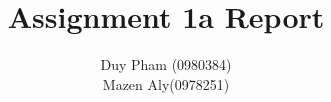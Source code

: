 \documentclass[10pt, a4paper, titlepage]{article} %
\begin{document}
    \title{\rmfamily\normalfont{}\\
    Assignment 1a Report}
    \author{Duy Pham (0980384) \\ Mazen Aly(0978251)}
    \date{} %
    
    \maketitle
    

    
    
    
    
\end{document}

